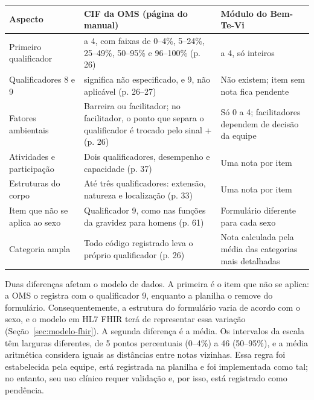 \begin{quadro}[H]
	\centering
	\caption{CIF da OMS e adaptação implementada no Bem-Te-Vi}
	\label{qua:cif-oms}
	\footnotesize
	\begin{tabularx}{\textwidth}{|>{\raggedright\arraybackslash}p{}|>{\raggedright\arraybackslash}X|>{\raggedright\arraybackslash}p{}|}
		\hline
		Aspecto & CIF da OMS (página do manual) & Módulo do Bem-Te-Vi \\ \hline
		Primeiro qualificador & 0 a 4, com faixas de 0--4\%, 5--24\%, 25--49\%, 50--95\% e 96--100\% (p. 26) & 0 a 4,
			só inteiros \\ \hline
		Qualificadores 8 e 9 & 8 significa não especificado, e 9, não aplicável (p. 26--27) & Não existem; item sem nota
			fica pendente \\ \hline
		Fatores ambientais & Barreira ou facilitador; no facilitador, o ponto que separa o qualificador é trocado
			pelo sinal + (p. 26) & Só 0 a 4; facilitadores dependem de decisão da equipe \\ \hline
		Atividades e participação & Dois qualificadores, desempenho e capacidade (p. 37) & Uma nota por item \\ \hline
		Estruturas do corpo & Até três qualificadores: extensão, natureza e localização (p. 33) & Uma nota por item \\ \hline
		Item que não se aplica ao sexo & Qualificador 9, como nas funções da gravidez para homens (p. 61) & Formulário
			diferente para cada sexo \\ \hline
		Categoria ampla & Todo código registrado leva o próprio qualificador (p. 26) & Nota calculada pela média das
			categorias mais detalhadas \\ \hline
	\end{tabularx}
\end{quadro}

Duas diferenças afetam o modelo de dados. A primeira é o item que não se aplica: a OMS o registra com o qualificador
9, enquanto a planilha o remove do formulário. Consequentemente, a estrutura do formulário varia de acordo com o sexo,
e o modelo em HL7 FHIR terá de representar essa variação (Seção~\ref{sec:modelo-fhir}). A segunda diferença é a
média. Os intervalos da escala têm larguras diferentes, de 5 pontos percentuais (0--4\%) a 46 (50--95\%), e a média
aritmética considera iguais as distâncias entre notas vizinhas. Essa regra foi estabelecida pela equipe, está
registrada na planilha e foi implementada como tal; no entanto, seu uso clínico requer validação e, por isso, está
registrado como pendência.

